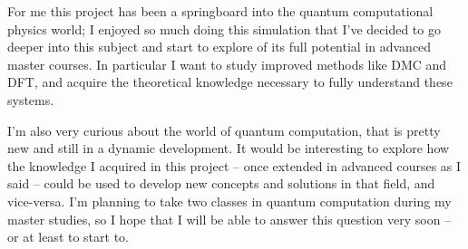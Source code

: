 For me this project has been a springboard into the quantum computational physics world; I enjoyed so much doing this simulation that I've decided to go deeper into this subject and start to explore of its full potential in advanced master courses. In particular I want to study improved methods like DMC and DFT, and acquire the theoretical knowledge necessary to fully understand these systems.

I'm also very curious about the world of quantum computation, that is pretty new and still in a dynamic development. It would be interesting to explore how the knowledge I acquired in this project -- once extended in advanced courses as I said -- could be used to develop new concepts and solutions in that field, and vice-versa. I'm planning to take two classes in quantum computation during my master studies, so I hope that I will be able to answer this question very soon -- or at least to start to.
